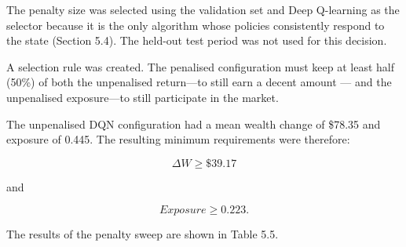 The penalty size was selected using the validation set and Deep
Q-learning as the selector because it is the only algorithm whose
policies consistently respond to the state (Section 5.4). The held-out
test period was not used for this decision.

A selection rule was created. The penalised configuration must keep at
least half (50\%) of both the unpenalised return---to still earn a
decent amount --- and the unpenalised exposure---to still participate in
the market.

The unpenalised DQN configuration had a mean wealth change of \$78.35
and exposure of 0.445. The resulting minimum requirements were
therefore:

\[\Delta W \geq \$ 39.17\]

and

\[Exposure \geq 0.223.\]

The results of the penalty sweep are shown in Table 5.5.


